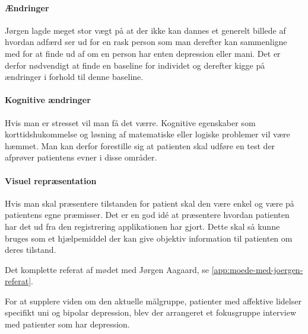 \paragraph{Ændringer}
Jørgen lagde meget stor vægt på at der ikke kan dannes et generelt billede af hvordan adfærd ser ud for en rask person som man derefter kan sammenligne med for at finde ud af om en person har enten depression eller mani.
Det er derfor nødvendigt at finde en baseline for individet og derefter kigge på ændringer i forhold til denne baseline.

\paragraph{Kognitive ændringer}
Hvis man er stresset vil man få det værre. 
Kognitive egenskaber som korttidshukommelse og løsning af matematiske eller logiske problemer vil være hæmmet.
Man kan derfor forestille sig at patienten skal udføre en test der afprøver patientens evner i disse områder.

\paragraph{Visuel repræsentation}
Hvis man skal præsentere tilstanden for patient skal den være enkel og være på patientens egne præmisser. Det er en god idé at præsentere hvordan patienten har det ud fra den registrering applikationen har gjort. Dette skal så kunne bruges som et hjælpemiddel der kan give objektiv information til patienten om deres tilstand.

Det komplette referat af mødet med Jørgen Aagaard, se \cref{app:moede-med-joergen-referat}.

For at supplere viden om den aktuelle målgruppe, patienter med affektive lidelser specifikt uni og bipolar depression, blev der arrangeret et fokusgruppe interview med patienter som har depression.	 